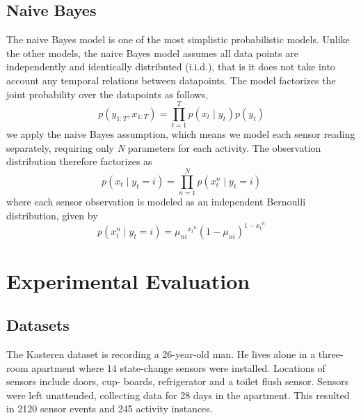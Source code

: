 \documentclass[11pt, oneside]{article}   	%
\begin{document}
\subsection{Naive Bayes}
The naive Bayes model is one of the most simplistic probabilistic models. Unlike the other models, the naive Bayes model assumes all data points are independently and identically distributed (i.i.d.), that is it does not take into account any temporal relations between datapoints. The model factorizes the joint probability over the datapoints as follows,
\begin{equation}
p({y}_{1:T},{x}_{1:T})=\prod_{t=1}^{T}p({{x}_{t}\mid {y}_{t}}^{})p({y}_{t})
\end{equation}
we apply the naive Bayes assumption, which means we model each sensor reading separately, requiring only
\textit{N} parameters for each activity. The observation distribution therefore factorizes as
\begin{equation}
p({x}_{t}\mid{y}_{t}=i)=\prod_{n=1}^{N}p({{x}_{t}^{n}\mid {y}_{t}}=i)
\end{equation}
where each sensor observation is modeled as an independent Bernoulli distribution, given by
\begin{equation}
p({{x}_{t}^{n}\mid {y}_{t}}=i)={{\mu}_{ni}}^{{{x}_{t}}^n}{(1-{\mu}_{ni})}^{1-{{x}_{t}}^n}
\end{equation}

\section{Experimental Evaluation}

\subsection{Datasets}

The Kasteren dataset is recording a 26-year-old man. He lives alone in a three-room apartment where 14 state-change sensors were installed. Locations of sensors include doors, cup- boards, refrigerator and a toilet flush sensor. Sensors were left unattended, collecting data for 28 days in the apartment. This resulted in 2120 sensor events and 245 activity instances.
\end{document}
